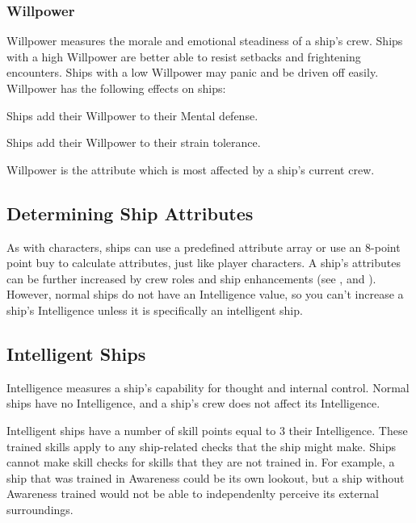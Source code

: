     \subsubsection{Willpower}
      Willpower measures the morale and emotional steadiness of a ship's crew.
      Ships with a high Willpower are better able to resist setbacks and frightening encounters.
      Ships with a low Willpower may panic and be driven off easily.
      Willpower has the following effects on ships:
      \begin{raggeditemize}
        \item Ships add their Willpower to their Mental defense.
        \item Ships add their Willpower to their strain tolerance.
      \end{raggeditemize}

      Willpower is the attribute which is most affected by a ship's current crew.

  \subsection{Determining Ship Attributes}
    As with characters, ships can use a predefined attribute array or use an 8-point point buy to calculate attributes, just like player characters.
    A ship's attributes can be further increased by crew roles and ship enhancements (see , and ).
    However, normal ships do not have an Intelligence value, so you can't increase a ship's Intelligence unless it is specifically an intelligent ship.

  \subsection{Intelligent Ships}\label{Intelligent Ships}
    Intelligence measures a ship's capability for thought and internal control.
    Normal ships have no Intelligence, and a ship's crew does not affect its Intelligence.

    Intelligent ships have a number of skill points equal to 3 \add their Intelligence.
    These trained skills apply to any ship-related checks that the ship might make.
    Ships cannot make skill checks for skills that they are not trained in.
    For example, a ship that was trained in Awareness could be its own lookout, but a ship without Awareness trained would not be able to independenlty perceive its external surroundings.

